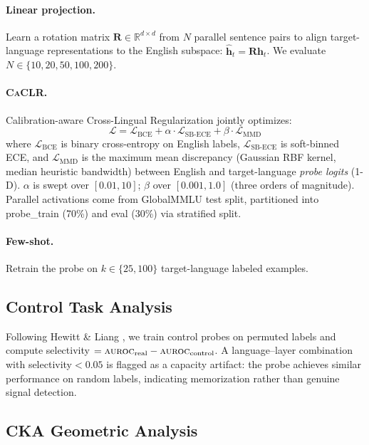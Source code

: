 \documentclass[11pt,a4paper]{article}
\newcommand{\auroc}{\textsc{auroc}}
\newcommand{\caclr}{\textsc{CaCLR}}
\begin{document}
\paragraph{Linear projection.}
Learn a rotation matrix $\mathbf{R} \in \mathbb{R}^{d \times d}$ from $N$ parallel sentence pairs to align target-language representations to the English subspace: $\hat{\mathbf{h}}_t = \mathbf{R} \mathbf{h}_t$.
We evaluate $N \in \{10, 20, 50, 100, 200\}$.

\paragraph{\caclr{}.}
Calibration-aware Cross-Lingual Regularization jointly optimizes:
\begin{equation}
\mathcal{L} = \mathcal{L}_{\text{BCE}} + \alpha \cdot \mathcal{L}_{\text{SB-ECE}} + \beta \cdot \mathcal{L}_{\text{MMD}}
\label{eq:caclr}
\end{equation}
where $\mathcal{L}_{\text{BCE}}$ is binary cross-entropy on English labels, $\mathcal{L}_{\text{SB-ECE}}$ is soft-binned ECE, and $\mathcal{L}_{\text{MMD}}$ is the maximum mean discrepancy (Gaussian RBF kernel, median heuristic bandwidth) between English and target-language \emph{probe logits} (1-D).
$\alpha$ is swept over $[0.01, 10]$; $\beta$ over $[0.001, 1.0]$ (three orders of magnitude).
Parallel activations come from GlobalMMLU test split, partitioned into probe\_train (70\%) and eval (30\%) via stratified split.

\paragraph{Few-shot.}
Retrain the probe on $k \in \{25, 100\}$ target-language labeled examples.

\subsection{Control Task Analysis}
\label{sec:control}

Following Hewitt \& Liang \citeyear{hewitt2019designing}, we train control probes on permuted labels and compute selectivity $= \auroc{}_{\text{real}} - \auroc{}_{\text{control}}$.
A language--layer combination with selectivity${<}0.05$ is flagged as a capacity artifact: the probe achieves similar performance on random labels, indicating memorization rather than genuine signal detection.

\subsection{CKA Geometric Analysis}
\label{sec:cka}
\end{document}
